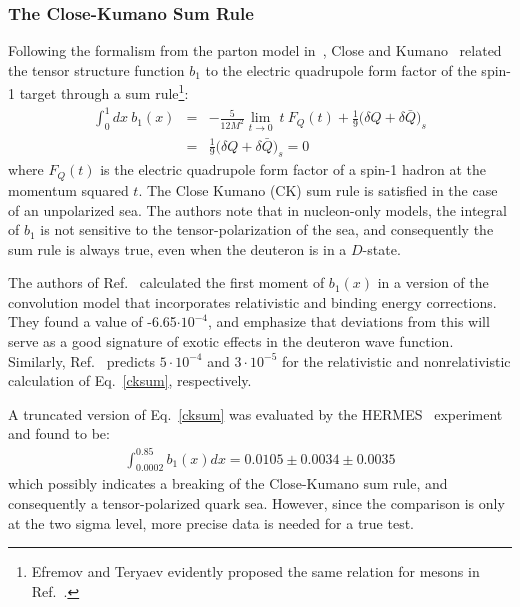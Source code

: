 \subsubsection{The Close-Kumano Sum Rule}
\label{CKSEC}
Following the formalism from the parton model in~\cite{Hoodbhoy:1988am}, Close and
Kumano~\cite{Close:1990zw} related the tensor structure function $b_1$ to the electric quadrupole
form factor of the spin-1 target through a sum rule\footnote{Efremov and Teryaev evidently proposed the same relation for
mesons in Ref.~\cite{Efremov:1981vs}.}:
\begin{eqnarray}
\int_0^1 dx~b_1(x)  & = &  - \frac{5}{12 M^2} \lim_{t \rightarrow 0}~t~F_Q(t)
                           + \frac{1}{9} \Big(\delta Q + \delta \bar{Q}\Big)_s \nonumber \\
                    & = & \frac{1}{9} \Big(\delta Q + \delta \bar{Q}\Big)_s  = 0 
\label{cksum}
\end{eqnarray}
where $F_Q(t)$ is the electric quadrupole form factor of a spin-1 hadron at the momentum squared $t$. 
The Close Kumano (CK) sum rule is satisfied in the case of an unpolarized sea. The authors note
that in nucleon-only models, the integral of $b_1$ is not sensitive to the
tensor-polarization of the sea, and consequently the sum rule is always true, even when the
deuteron is in a $D$-state.

The authors of Ref.~\cite{Khan:1991qk} calculated 
the first moment of $b_1(x)$ in a
version of the convolution model that incorporates relativistic and binding energy corrections.  They found a value of -6.65$\cdot 10^{-4}$, and
emphasize that deviations from this will serve as a good signature of exotic effects in the deuteron wave function.  Similarly, Ref.~\cite{Umnikov:1996qv} predicts $5\cdot 10^{-4}$ and  $3\cdot 10^{-5}$ for the relativistic and nonrelativistic calculation of Eq.~\ref{cksum}, respectively.




A truncated version of Eq.~\ref{cksum} was evaluated by the HERMES~\cite{Riedl:2005jq,Airapetian:2005cb} experiment and found to be:
\begin{eqnarray}
\int_{0.0002}^{0.85} b_1(x) dx = 0.0105 \pm 0.0034 \pm 0.0035
\end{eqnarray}
which possibly indicates a breaking of the Close-Kumano sum rule, and consequently a
tensor-polarized quark sea.  However, since the comparison is only at the two sigma level,  more precise data is needed for a true test.


%

